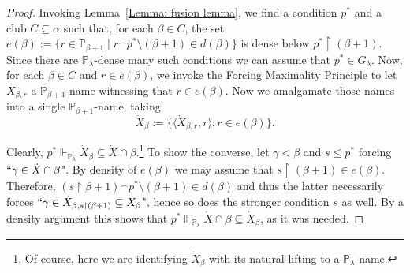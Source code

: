 \documentclass[11pt]{amsart}
\renewcommand{\restriction}{\mathbin\upharpoonright}    %
\theoremstyle{definition}
\newcounter{condition}
\theoremstyle{remark}
\newcommand\<{{<}}
\newcommand{\one}{\mathop{1\hskip-3pt {\rm l}}}
\def\s{\subseteq}
\def\forces{\Vdash}
\begin{document}
\begin{proof}

   Invoking Lemma~\ref{Lemma: fusion lemma}, we find a condition $p^*$ and a club $C\s \alpha$ such that, for each $\beta\in C$, the set $e(\beta):=\{r\in \mathbb{P}_{\beta+1}\mid r{}^\smallfrown p^*\setminus (\beta+1)\in d(\beta)\}$ is dense below $p^*\restriction (\beta+1)$. Since there are $\mathbb{P}_\lambda$-dense many such conditions we can assume that $p^*\in G_\lambda$. Now, for each $\beta\in C$ and $r\in e(\beta)$, we invoke the Forcing Maximality Principle to let $\dot{X}_{\beta,r}$ a  $\mathbb{P}_{\beta+1}$-name witnessing that $r\in e(\beta)$. Now we amalgamate those names into a single $\mathbb{P}_{\beta+1}$-name, taking
   $$\dot{X}_\beta:=\{\langle \dot{X}_{\beta,r},r\rangle: r\in e(\beta)\}.$$

   Clearly, $p^*\forces_{\mathbb{P}_\lambda}\dot{X}_\beta\s \dot{X}\cap \beta$.\footnote{Of course, here we are identifying $\dot{X}_\beta$ with its natural lifting to a $\mathbb{P}_\lambda$-name.} To show the converse, let $\gamma<\beta$ and $s\leq p^*$ forcing $``\gamma\in \dot{X}\cap \beta$". By density of $e(\beta)$ we may assume that $s\restriction (\beta+1)\in e(\beta)$. Therefore, $(s\restriction \beta+1){}^\smallfrown p^*\setminus (\beta+1)\in d(\beta)$ and thus the latter necessarily forces $``\gamma\in \dot{X}_{\beta,s\restriction(\beta+1)}\s \dot{X}_\beta$", hence so does the stronger condition $s$ as well. By a density argument this shows that  $p^*\forces_{\mathbb{P}_\lambda} \dot{X}\cap \beta\s \dot{X}_\beta$, as it was needed.
   \medskip


\end{proof}
\end{document}
